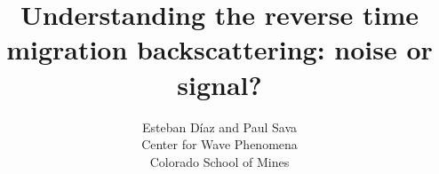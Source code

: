 

\author{Esteban D\'{i}az and Paul Sava\\ 
Center for Wave Phenomena \\ 
Colorado School of Mines}
\title{Understanding the reverse time migration backscattering: noise or signal?}
\maketitle










